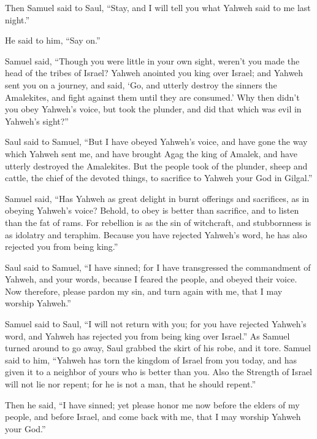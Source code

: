 {\par }{\PP {}Then Samuel said to Saul, “Stay, and I will tell you what Yahweh said to me last night.”
\par }{\PP He said to him, “Say on.”
\par }{\PP {}Samuel said, “Though you were little in your own sight, weren’t you made the head of the tribes of Israel? Yahweh anointed you king over Israel;
and Yahweh sent you on a journey, and said, ‘Go, and utterly destroy the sinners the Amalekites, and fight against them until they are consumed.’
Why then didn’t you obey Yahweh’s voice, but took the plunder, and did that which was evil in Yahweh’s sight?”
\par }{\PP {}Saul said to Samuel, “But I have obeyed Yahweh’s voice, and have gone the way which Yahweh sent me, and have brought Agag the king of Amalek, and have utterly destroyed the Amalekites.
But the people took of the plunder, sheep and cattle, the chief of the devoted things, to sacrifice to Yahweh your God in Gilgal.”
\par }{\PP {}Samuel said, “Has Yahweh as great delight in burnt offerings and sacrifices, as in obeying Yahweh’s voice? Behold, to obey is better than sacrifice, and to listen than the fat of rams.
For rebellion is as the sin of witchcraft, and stubbornness is as idolatry and teraphim. Because you have rejected Yahweh’s word, he has also rejected you from being king.”
\par }{\PP {}Saul said to Samuel, “I have sinned; for I have transgressed the commandment of Yahweh, and your words, because I feared the people, and obeyed their voice.
Now therefore, please pardon my sin, and turn again with me, that I may worship Yahweh.”
\par }{\PP {}Samuel said to Saul, “I will not return with you; for you have rejected Yahweh’s word, and Yahweh has rejected you from being king over Israel.”
As Samuel turned around to go away, Saul grabbed the skirt of his robe, and it tore.
Samuel said to him, “Yahweh has torn the kingdom of Israel from you today, and has given it to a neighbor of yours who is better than you.
Also the Strength of Israel will not lie nor repent; for he is not a man, that he should repent.”
\par }{\PP {}Then he said, “I have sinned; yet please honor me now before the elders of my people, and before Israel, and come back with me, that I may worship Yahweh your God.”
}
